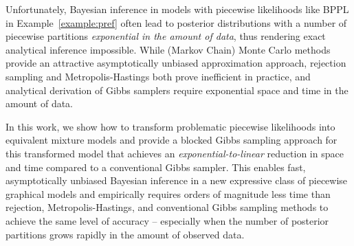 Unfortunately, Bayesian inference in models with piecewise likelihoods
like BPPL in Example~\ref{example:pref} often lead to posterior
distributions with a number of piecewise partitions \emph{exponential in the
amount of data}, thus rendering exact analytical inference impossible.
While (Markov Chain) Monte Carlo methods provide an attractive
asymptotically unbiased approximation approach, rejection sampling and
Metropolis-Hastings both prove inefficient in practice, and analytical
derivation of Gibbs samplers require exponential space and time in the
amount of data.


In this work, we show how to transform problematic
piecewise likelihoods into equivalent mixture models and provide
a blocked Gibbs sampling approach for this transformed model that
achieves an \emph{exponential-to-linear} reduction in space and time compared
to a conventional Gibbs sampler.  This enables fast, asymptotically
unbiased Bayesian inference in a new expressive class of piecewise graphical
models and empirically requires orders of magnitude less time than
rejection, Metropolis-Hastings, and conventional Gibbs sampling
methods to achieve the same level of accuracy -- especially
when the number of posterior partitions grows rapidly in the amount
of observed data.

%

